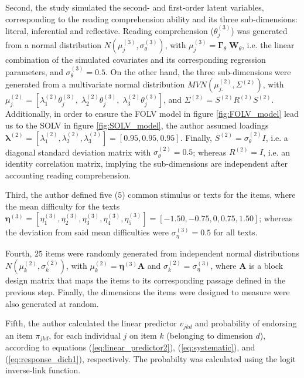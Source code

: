 Second, the study simulated the second- and first-order latent variables, corresponding to the reading comprehension ability and its three sub-dimensions: literal, inferential and reflective. Reading comprehension ($\theta^{(3)}_{j}$) was generated from a normal distribution $N( \mu^{(3)}_{j}, \sigma^{(3)}_{\theta} )$, with $\mu^{(3)}_{j} = \pmb{\Gamma}_{\theta} \; \mathbf{W}_{\theta}$, i.e. the linear combination of the simulated covariates and its corresponding regression parameters, and $\sigma^{(3)}_{\theta}=0.5$. On the other hand, the three sub-dimensions were generated from a multivariate normal distribution $MVN( \mu^{(2)}_{j.} , \Sigma^{(2)})$, with $\mu^{(2)}_{j.} = [\lambda^{(2)}_{1} \theta^{(3)}_{j}, \; \lambda^{(2)}_{2} \theta^{(3)}_{j}, \; \lambda^{(2)}_{3} \theta^{(3)}_{j} ]$, and $\Sigma^{(2)} = S^{(2)} R^{(2)} S^{(2)}$. Additionally, in order to ensure the FOLV model in figure \ref{fig:FOLV_model} lead us to the SOLV in figure \ref{fig:SOLV_model}, the author assumed loadings $\pmb{\lambda}^{(2)} = [\lambda^{(2)}_{1}, \lambda^{(2)}_{2}, \lambda^{(2)}_{3}] = [0.95, 0.95, 0.95]$. Finally, $S^{(2)} = \sigma^{(2)}_{\theta} I$, i.e. a diagonal standard deviation matrix with $\sigma^{(2)}_{\theta} = 0.5$; whereas $R^{(2)} = I$, i.e. an identity correlation matrix, implying the sub-dimensions are independent after accounting reading comprehension.

Third, the author defined five ($5$) common stimulus or texts for the items, where the mean difficulty for the texts $\pmb{\eta}^{(3)} = [\eta^{(3)}_{1}, \eta^{(3)}_{2}, \eta^{(3)}_{3}, \eta^{(3)}_{4}, \eta^{(3)}_{5}] = [-1.50, -0.75, 0, 0.75, 1.50]$; whereas the deviation from said mean difficulties were $\sigma^{(3)}_{\eta} = 0.5$ for all texts. 

Fourth, $25$ items were randomly generated from independent normal distributions $N( \mu^{(2)}_{k}, \sigma^{(2)}_{k} ) $, with $\mu^{(2)}_{k} = \pmb{\eta}^{(3)} \mathbf{A}$ and $\sigma^{(2)}_{k} = \sigma^{(3)}_{\eta}$, where $\mathbf{A}$ is a block design matrix that maps the items to its corresponding passage defined in the previous step. Finally, the dimensions the items were designed to measure were also generated at random.

Fifth, the author calculated the linear predictor $v_{jkd}$ and probability of endorsing an item $\pi_{jkd}$, for each individual $j$ on item $k$ (belonging to dimension $d$), according to equations (\ref{eq:linear_predictor2}), (\ref{eq:systematic}), and (\ref{eq:response_dich1}), respectively. The probabilty was calculated using the logit inverse-link function.
	
